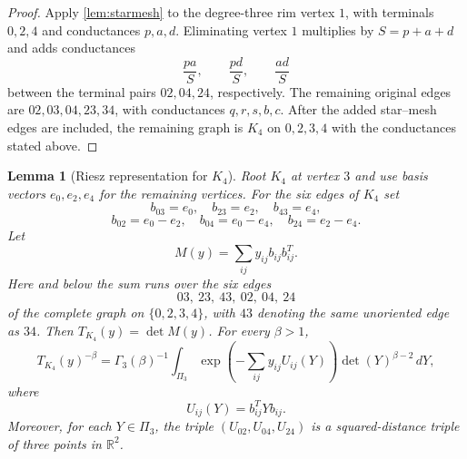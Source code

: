 \documentclass[preprint,12pt,authoryear]{elsarticle}
\numberwithin{equation}{section}
\newtheorem{lemma}[theorem]{Lemma}
\theoremstyle{definition}
\theoremstyle{remark}
\newcommand{\R}{\mathbb{R}}
\newcommand{\1}{\mathbf{1}}
\begin{document}
\begin{proof}
Apply \cref{lem:starmesh} to the degree-three rim vertex $1$, with terminals $0,2,4$ and conductances $p,a,d$.  Eliminating vertex $1$ multiplies by $S=p+a+d$ and adds conductances
\begin{equation}
        \frac{pa}{S},\qquad \frac{pd}{S},\qquad \frac{ad}{S}
\end{equation}
between the terminal pairs $02,04,24$, respectively.  The remaining original edges are $02,03,04,23,34$, with conductances $q,r,s,b,c$.  After the added star--mesh edges are included, the remaining graph is $K_4$ on $0,2,3,4$ with the conductances stated above.
\end{proof}

\begin{lemma}[Riesz representation for $K_4$]
\label{lem:k4-riesz}
Root $K_4$ at vertex $3$ and use basis vectors $e_0,e_2,e_4$ for the remaining vertices.  For the six edges of $K_4$ set
\begin{equation}
        b_{03}=e_0,
        \quad b_{23}=e_2,
        \quad b_{43}=e_4,
\end{equation}
\begin{equation}
        b_{02}=e_0-e_2,
        \quad b_{04}=e_0-e_4,
        \quad b_{24}=e_2-e_4.
\end{equation}
Let
\begin{equation}
        M(y)=\sum_{ij} y_{ij} b_{ij}b_{ij}^T .
\end{equation}
Here and below the sum runs over the six edges
\begin{equation}
        03,\ 23,\ 43,\ 02,\ 04,\ 24
\end{equation}
of the complete graph on $\{0,2,3,4\}$, with $43$ denoting the same unoriented edge as $34$.  Then $T_{K_4}(y)=\det M(y)$.  For every $\beta>1$,
\begin{equation}
        T_{K_4}(y)^{-\beta}
        =\Gamma_3(\beta)^{-1}\int_{\Pi_3}
        \exp\left(-\sum_{ij}y_{ij}U_{ij}(Y)\right)
        \det(Y)^{\beta-2}\,dY,
\end{equation}
where
\begin{equation}
        U_{ij}(Y)=b_{ij}^TYb_{ij}.
\end{equation}
Moreover, for each $Y\in\Pi_3$, the triple $(U_{02},U_{04},U_{24})$ is a squared-distance triple of three points in $\R^2$.
\end{lemma}
\end{document}

